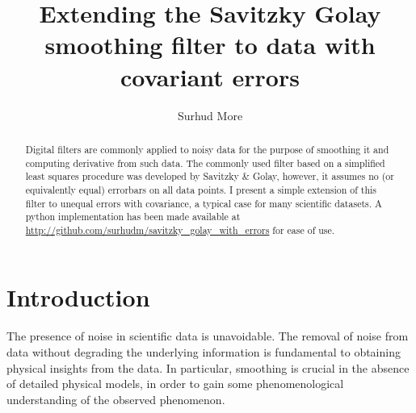 \documentclass[iop, apj, onecolumn]{emulateapj}
\begin{document}


\title{Extending the Savitzky Golay smoothing filter to data with covariant
errors}
\author{
Surhud More 
}



\begin{abstract}
Digital filters are commonly applied to noisy data for the purpose of smoothing
it and computing derivative from such data. The commonly used filter based on a
simplified least squares procedure was developed by Savitzky \& Golay, however,
it assumes no (or equivalently equal) errorbars on all data points.  I present a
simple extension of this filter to unequal errors with covariance, a typical
case for many scientific datasets. A python implementation has been made
available at \url{http://github.com/surhudm/savitzky\_golay\_with\_errors} for
ease of use.
\end{abstract}

\keywords{}


\section{Introduction}
\label{sec:intro}

The presence of noise in scientific data is unavoidable. The removal of noise
from data without degrading the underlying information is fundamental to
obtaining physical insights from the data. In particular, smoothing is crucial in
the absence of detailed physical models, in order to gain some phenomenological
understanding of the observed phenomenon. 
\end{document}
